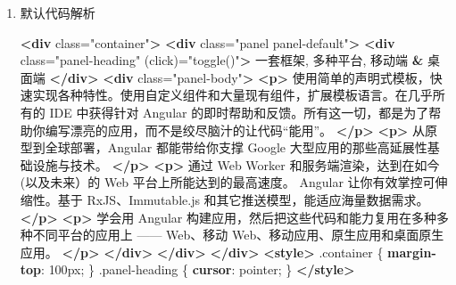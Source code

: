 \documentclass[
]{article}
\newenvironment{Shaded}{}{}
\newcommand{\DataTypeTok}[1]{\textcolor[rgb]{0.56,0.13,0.00}{#1}}
\newcommand{\DecValTok}[1]{\textcolor[rgb]{0.25,0.63,0.44}{#1}}
\newcommand{\ErrorTok}[1]{\textcolor[rgb]{1.00,0.00,0.00}{\textbf{#1}}}
\newcommand{\FunctionTok}[1]{\textcolor[rgb]{0.02,0.16,0.49}{#1}}
\newcommand{\KeywordTok}[1]{\textcolor[rgb]{0.00,0.44,0.13}{\textbf{#1}}}
\newcommand{\NormalTok}[1]{#1}
\newcommand{\OperatorTok}[1]{\textcolor[rgb]{0.40,0.40,0.40}{#1}}
\newcommand{\OtherTok}[1]{\textcolor[rgb]{0.00,0.44,0.13}{#1}}
\newcommand{\StringTok}[1]{\textcolor[rgb]{0.25,0.44,0.63}{#1}}
\begin{document}
\begin{enumerate}
\def\labelenumi{\arabic{enumi}.}
\item
  默认代码解析

\begin{Shaded}
\begin{Highlighting}[]
\KeywordTok{\textless{}div}\OtherTok{ class=}\StringTok{"container"}\KeywordTok{\textgreater{}}
  \KeywordTok{\textless{}div}\OtherTok{ class=}\StringTok{"panel panel{-}default"}\KeywordTok{\textgreater{}}
    \KeywordTok{\textless{}div}\OtherTok{ class=}\StringTok{"panel{-}heading"}\OtherTok{ (click)=}\StringTok{"toggle()"}\KeywordTok{\textgreater{}}
\NormalTok{      一套框架, 多种平台, 移动端 }\ErrorTok{\&}\NormalTok{ 桌面端}
    \KeywordTok{\textless{}/div\textgreater{}}
    \KeywordTok{\textless{}div}\OtherTok{ class=}\StringTok{"panel{-}body"}\KeywordTok{\textgreater{}}
      \KeywordTok{\textless{}p\textgreater{}}
\NormalTok{        使用简单的声明式模板，快速实现各种特性。使用自定义组件和大量现有组件，扩展模板语言。在几乎所有的}
\NormalTok{        IDE 中获得针对 Angular}
\NormalTok{        的即时帮助和反馈。所有这一切，都是为了帮助你编写漂亮的应用，而不是绞尽脑汁的让代码“能用”。}
      \KeywordTok{\textless{}/p\textgreater{}}
      \KeywordTok{\textless{}p\textgreater{}}
\NormalTok{        从原型到全球部署，Angular 都能带给你支撑 Google}
\NormalTok{        大型应用的那些高延展性基础设施与技术。}
      \KeywordTok{\textless{}/p\textgreater{}}
      \KeywordTok{\textless{}p\textgreater{}}
\NormalTok{        通过 Web Worker 和服务端渲染，达到在如今(以及未来）的 Web}
\NormalTok{        平台上所能达到的最高速度。 Angular 让你有效掌控可伸缩性。基于}
\NormalTok{        RxJS、Immutable.js 和其它推送模型，能适应海量数据需求。}
      \KeywordTok{\textless{}/p\textgreater{}}
      \KeywordTok{\textless{}p\textgreater{}}
\NormalTok{        学会用 Angular}
\NormalTok{        构建应用，然后把这些代码和能力复用在多种多种不同平台的应用上 ——}
\NormalTok{        Web、移动 Web、移动应用、原生应用和桌面原生应用。}
      \KeywordTok{\textless{}/p\textgreater{}}
    \KeywordTok{\textless{}/div\textgreater{}}
  \KeywordTok{\textless{}/div\textgreater{}}
\KeywordTok{\textless{}/div\textgreater{}}
\KeywordTok{\textless{}style\textgreater{}}
  \FunctionTok{.container}\NormalTok{ \{}
    \KeywordTok{margin{-}top}\NormalTok{: }\DecValTok{100}\DataTypeTok{px}\OperatorTok{;}
\NormalTok{  \}}
  \FunctionTok{.panel{-}heading}\NormalTok{ \{}
    \KeywordTok{cursor}\NormalTok{: }\DecValTok{pointer}\OperatorTok{;}
\NormalTok{  \}}
\KeywordTok{\textless{}/style\textgreater{}}
\end{Highlighting}
\end{Shaded}


\end{enumerate}
\end{document}
